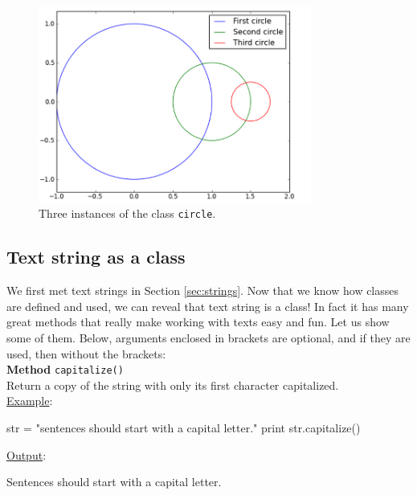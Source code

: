 \begin{figure}[!ht]
\begin{center}
\includegraphics[width=0.8\textwidth]{imgp/3circ.png}
\end{center}
\vspace{-2mm}
\caption{Three instances of the class {\tt circle}.}
\label{fig:3circ}
\end{figure}

\subsection{Text string as a class} \label{subsec:textstrclass}

We first met text strings in Section \ref{sec:strings}. Now that 
we know how classes are defined and used, we can reveal that 
text string is a class! In fact it has many great methods that 
really make working with texts easy and fun. Let us show some 
of them. Below, arguments enclosed in brackets are optional,
and if they are used, then without the brackets:\\

\noindent
{\bf Method} {\tt capitalize()}\\

\noindent
Return a copy of the string with only its first character capitalized.\\

\noindent
\underline{Example}:
\begin{bluecode}
str = "sentences should start with a capital letter."
print str.capitalize()
\end{bluecode}
\underline{Output}:
\begin{greencode}
Sentences should start with a capital letter.
\end{greencode}
\vspace{4mm}

